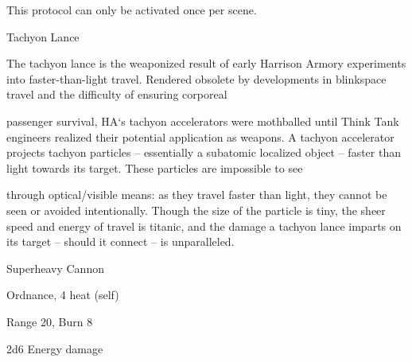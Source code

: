          This protocol can only be activated once per scene.
 

Tachyon Lance  

The tachyon lance is the weaponized result of early Harrison Armory experiments into faster-than-light  
travel. Rendered obsolete by developments in blinkspace travel and the difficulty of ensuring corporeal  

passenger survival, HA‘s tachyon accelerators were mothballed until Think Tank engineers realized their  
potential application as weapons. A tachyon accelerator projects tachyon particles -- essentially a  
subatomic localized object -- faster than light towards its target. These particles are impossible to see  

through optical/visible means: as they travel faster than light, they cannot be seen or avoided intentionally.  
Though the size of the particle is tiny, the sheer speed and energy of travel is titanic, and the damage a  
tachyon lance imparts on its target -- should it connect -- is unparalleled.   

Superheavy Cannon
 
Ordnance, 4 heat (self)
 
Range 20, Burn 8
 
2d6 Energy damage
 
